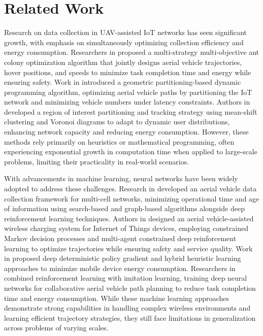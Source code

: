\documentclass[sigconf]{acmart}
\begin{document}
\section{Related Work}
Research on data collection in UAV-assisted IoT networks has seen significant growth, with emphasis on simultaneously optimizing collection efficiency and energy consumption. Researchers in \cite{19-Multi-Objective_Ant_Colony_Optimization} proposed a multi-strategy multi-objective ant colony optimization algorithm that jointly designs aerial vehicle trajectories, hover positions, and speeds to minimize task completion time and energy while ensuring safety. Work in \cite{20-GPUDA} introduced a geometric partitioning-based dynamic programming algorithm, optimizing aerial vehicle paths by partitioning the IoT network and minimizing vehicle numbers under latency constraints. Authors in \cite{21-ROI} developed a region of interest partitioning and tracking strategy using mean-shift clustering and Voronoi diagrams to adapt to dynamic user distributions, enhancing network capacity and reducing energy consumption. However, these methods rely primarily on heuristics or mathematical programming, often experiencing exponential growth in computation time when applied to large-scale problems, limiting their practicality in real-world scenarios.



With advancements in machine learning, neural networks have been widely adopted to address these challenges. Research in \cite{22-minimizing_AOI} developed an aerial vehicle data collection framework for multi-cell networks, minimizing operational time and age of information using search-based and graph-based algorithms alongside deep reinforcement learning techniques. Authors in \cite{23-CMDP} designed an aerial vehicle-assisted wireless charging system for Internet of Things devices, employing constrained Markov decision processes and multi-agent constrained deep reinforcement learning to optimize trajectories while ensuring safety and service quality. Work in \cite{24-DDPG} proposed deep deterministic policy gradient and hybrid heuristic learning approaches to minimize mobile device energy consumption. Researchers in \cite{25-combinedRL_IL} combined reinforcement learning with imitation learning, training deep neural networks for collaborative aerial vehicle path planning to reduce task completion time and energy consumption. While these machine learning approaches demonstrate strong capabilities in handling complex wireless environments and learning efficient trajectory strategies, they still face limitations in generalization across problems of varying scales. %
\end{document}
